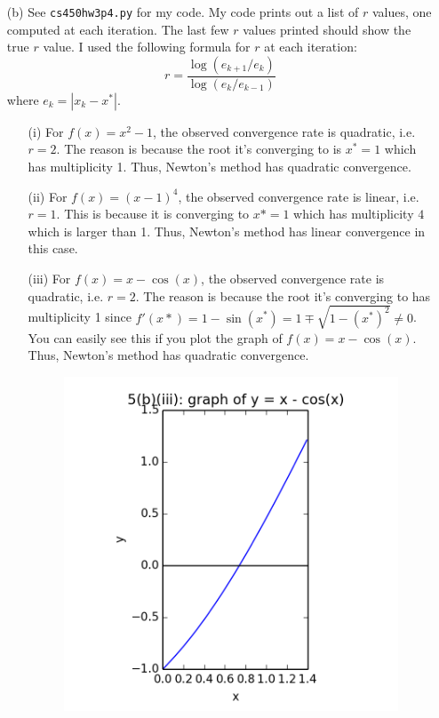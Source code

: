 \documentclass[10pt]{article}
\begin{document}
\begin{enumerate}
\begin{enumerate}
\end{enumerate}

\item[(b)] See \verb+cs450hw3p4.py+ for my code. My code prints out a list of $r $ values, one computed at each iteration. The last few $r$ values printed should show the true $r$ value. I used the following formula for $r$ at each iteration: $$
r = \frac{\log(e_{k+1}/e_k)}{\log(e_k/ e_{k-1})}
$$ where $ e_k = | x_k - x^* | $.

\begin{enumerate}
\item[(i)] For $ f(x) = x^2 - 1 $, the observed convergence rate is quadratic, i.e. $r = 2$. The reason is because the root it's converging to is $ x^* = 1 $ which has multiplicity 1. Thus, Newton's method has quadratic convergence.

\item[(ii)] For $ f(x) = (x-1)^4 $, the observed convergence rate is linear, i.e. $r = 1$. This is because it is converging to $ x* = 1 $ which has multiplicity $ 4 $ which is larger than 1. Thus, Newton's method has linear convergence in this case.

\item[(iii)] For $ f(x) = x - \cos(x) $, the observed convergence rate is quadratic, i.e. $r = 2$. The reason is because the root it's converging to has multiplicity 1 since $ f'(x*) = 1 - \sin(x^*) = 1 \mp \sqrt{1 - (x^*)^2} \neq 0 $. You can easily see this if you plot the graph of $ f(x) = x - \cos(x) $. Thus, Newton's method has quadratic convergence.

\begin{figure}[H]
  \centering
    \includegraphics[scale=0.8]{p5fig1}
\end{figure}

\end{enumerate}

\end{enumerate}
\end{document}

